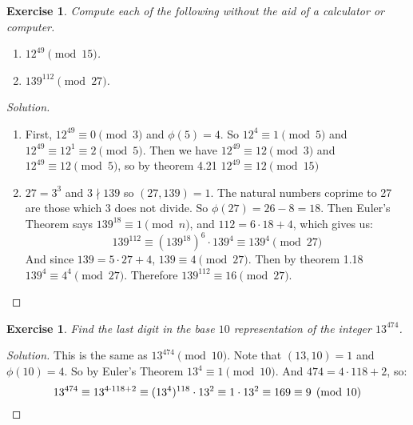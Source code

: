 \documentclass[12pt,leqno]{article}
\numberwithin{equation}{section}
\newtheorem{exer}[thm]{Exercise}
\theoremstyle{definition}
\begin{document}
\pagebreak
\begin{exer}
Compute each of the following without the aid of a calculator or
computer.
\begin{enumerate}
\item $12^{49} \pmod{15}$.
\item $139^{112} \pmod{27}$.
\end{enumerate}
\end{exer}
\begin{proof}[Solution]$ $\\
\begin{enumerate}
\item
First, $12^{49} \equiv 0 \pmod{3}$ and $\phi(5) = 4$. So $12^4 \equiv 1 \pmod{5}$ and $12^{49} \equiv 12^1 \equiv 2 \pmod{5}$.  Then we have $12^{49} \equiv 12 \pmod{3}$ and $12^{49} \equiv 12 \pmod{5}$, so by theorem 4.21 $12^{49} \equiv 12 \pmod{15}$

\item
$27 = 3^3$ and $3 \nmid 139$ so $(27, 139) = 1$.  The natural numbers coprime to 27 are those which 3 does not divide.  So $\phi(27) = 26 - 8 = 18$.  Then Euler's Theorem says $139^{18} \equiv 1 \pmod{n}$, and $112 = 6\cdot 18 + 4$, which gives us:
 \[139^{112} \equiv (139^{18})^6\cdot 139^4 \equiv 139^4 \pmod{27}\]
And since $139 = 5\cdot 27 + 4$, $139 \equiv 4 \pmod{27}$.  Then by theorem 1.18 $139^4 \equiv 4^4 \pmod{27}$.  Therefore $139^{112} \equiv 16 \pmod{27}$.
\end{enumerate}
\end{proof}

\begin{exer}
Find the last digit in the base $10$ representation of the integer
$13^{474}$.
\end{exer}
\begin{proof}[Solution]
This is the same as $13^{474} \pmod{10}$.  Note that $(13, 10) = 1$ and $\phi(10) = 4$.  So by Euler's Theorem $13^4 \equiv 1 \pmod{10}$.  And $474 = 4 \cdot 118 + 2$, so:
\[13^{474} \equiv 13^{4\cdot 118 + 2} \equiv (13^4)^{118}\cdot 13^2 \equiv 1\cdot 13^2\\ \equiv 169 \equiv 9 \pmod{10}\]
\end{proof}
\end{document}
